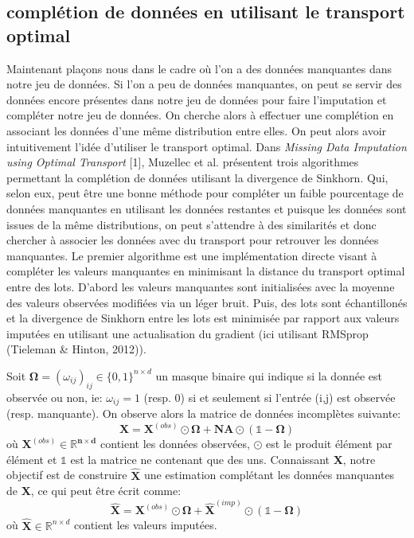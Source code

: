 \documentclass[acmsmall, natbib=false, nonacm]{acmart}
\begin{document}
\subsection{complétion de données en utilisant le transport optimal}
Maintenant plaçons nous dans le cadre où l'on a des données manquantes dans notre jeu de données.
Si l'on a peu de données manquantes, on peut se servir des données encore présentes dans notre jeu de données pour faire l'imputation et compléter notre jeu de données.
On cherche alors à effectuer une complétion en associant les données d'une même distribution entre elles.
On peut alors avoir intuitivement l'idée d'utiliser le transport optimal.
Dans \textit{Missing Data Imputation using Optimal Transport} [1], Muzellec et al. présentent trois algorithmes permettant la complétion de données utilisant la divergence de Sinkhorn.
Qui, selon eux, peut être une bonne méthode pour compléter un faible pourcentage de données manquantes en utilisant les données restantes et puisque les données sont issues de la même distributions, 
on peut s'attendre à des similarités et donc chercher à associer les données avec du transport pour retrouver les données manquantes.
Le premier algorithme est une implémentation directe visant à compléter les valeurs manquantes en minimisant la distance du transport optimal entre des lots. 
D'abord les valeurs manquantes sont initialisées avec la moyenne des valeurs observées modifiées via un léger bruit. Puis, des lots sont échantillonés et la divergence de Sinkhorn entre les lots est minimisée par rapport aux valeurs imputées en utilisant une actualisation du gradient (ici utilisant RMSprop (Tieleman \& Hinton, 2012)).

Soit $\mathbf{\Omega} = (\omega_{ij})_{ij} \in \{0,1\}^{n\times d}$ un masque binaire qui indique si la donnée est observée ou non, ie: $\omega_{ij} = 1$ (resp. 0) si et seulement si l'entrée (i,j) est observée (resp. manquante). 
On observe alors la matrice de données incomplètes suivante:
$$\textbf{X}=\textbf{X}^{(\textit{obs})}\odot \mathbf{\Omega} + \textbf{NA} \odot (\mathbf{\mathds{1}} - \mathbf{\Omega})$$
où $\mathbf{\textbf{X}^{(\textit{obs})}\in \mathbb{R}^{n\times d}}$ contient les données observées, $\mathbf{\odot}$ est le produit élément par élément et $\mathbf{\mathds{1}}$ est la matrice ne contenant que des uns. 
Connaissant \textbf{X}, notre objectif est de construire $\mathbf{\hat{X}}$ une estimation complétant les données manquantes de \textbf{X}, ce qui peut être écrit comme:
$$\hat{\mathbf{X}}=\textbf{X}^{(\textit{obs})}\odot \mathbf{\Omega} + \hat{\mathbf{X}}^{(\textit{imp})}\odot (\mathbf{\mathds{1}} - \mathbf{\Omega})$$
où $\hat{\mathbf{X}} \in \mathbb{R}^{n\times d}$ contient les valeurs imputées.
\end{document}
